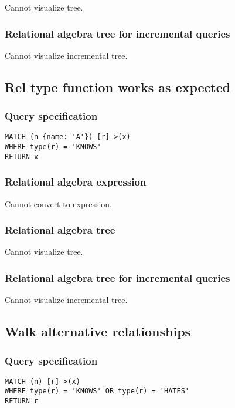 Cannot visualize tree.

\subsubsection*{Relational algebra tree for incremental queries}

Cannot visualize incremental tree.

\subsection{Rel type function works as expected}

\subsubsection*{Query specification}

\begin{lstlisting}
MATCH (n {name: 'A'})-[r]->(x)
WHERE type(r) = 'KNOWS'
RETURN x
\end{lstlisting}

\subsubsection*{Relational algebra expression}

Cannot convert to expression.

\subsubsection*{Relational algebra tree}

Cannot visualize tree.

\subsubsection*{Relational algebra tree for incremental queries}

Cannot visualize incremental tree.

\subsection{Walk alternative relationships}

\subsubsection*{Query specification}

\begin{lstlisting}
MATCH (n)-[r]->(x)
WHERE type(r) = 'KNOWS' OR type(r) = 'HATES'
RETURN r
\end{lstlisting}

